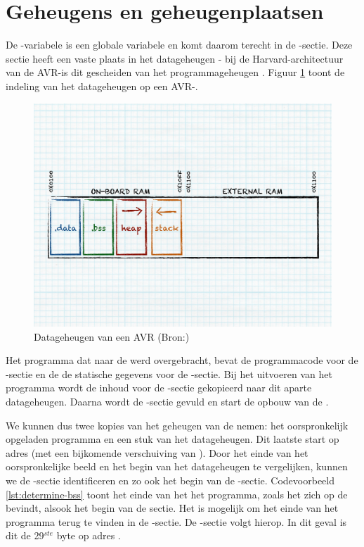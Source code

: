 \section{Geheugens en geheugenplaatsen}

De -variabele is een globale variabele en komt daarom terecht in
de -sectie. Deze sectie heeft een vaste plaats in het datageheugen -
bij de Harvard-architectuur van de AVR-\mcu is dit gescheiden van het
programmageheugen \citep{avr-memory}. Figuur \ref{fig:avr-ram-map} toont de
indeling van het datageheugen op een AVR-\mcu.

\begin{figure}[ht]
  \centering
  \includegraphics[width=0.9\linewidth]{resources/avr-ram-map.pdf}
  \caption[Datageheugen van een AVR \mcu]{Datageheugen van een AVR \mcu
  (Bron:\citep{avr-malloc})}
  \label{fig:avr-ram-map}
\end{figure}

Het programma dat naar de \mcu werd overgebracht, bevat de programmacode voor
de -sectie en de de statische gegevens voor de -sectie.
Bij het uitvoeren van het programma wordt de inhoud voor de -sectie
gekopieerd naar dit aparte datageheugen. Daarna wordt de -sectie
gevuld en start de opbouw van de .

We kunnen dus twee kopies van het geheugen van de \mcu nemen: het
oorspronkelijk opgeladen programma en een stuk van het datageheugen. Dit
laatste start op adres  (met een bijkomende verschuiving van
). Door het einde van het oorspronkelijke beeld en het begin van
het datageheugen te vergelijken, kunnen we de -sectie identificeren
en zo ook het begin van de -sectie. Codevoorbeeld
\ref{lst:determine-bss} toont het einde van het het programma, zoals het zich
op de \mcu bevindt, alsook het begin van de  sectie. Het is mogelijk
om het einde van het programma terug te vinden in de -sectie. De
-sectie volgt hierop. In dit geval is dit de 29$^{ste}$ byte op adres
.


